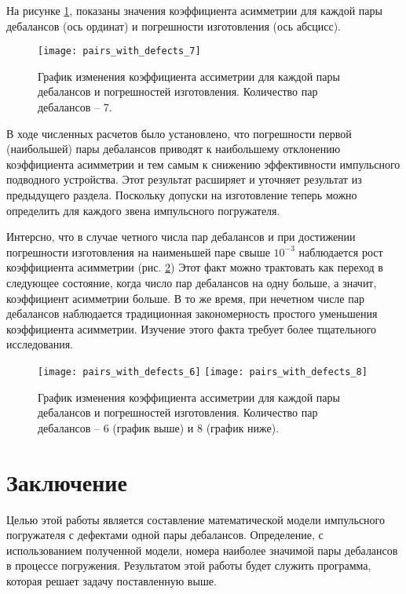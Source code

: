 На рисунке \ref{fig:pairs_with_defects_7}, показаны значения коэффициента асимметрии для каждой
пары дебалансов (ось ординат) и погрешности изготовления (ось абсцисс).

\begin{figure}[ht]
    \centering
    \texttt{[image: pairs\_with\_defects\_7]}
    \caption{График изменения коэффициента ассиметрии для каждой пары дебалансов и погрешностей изготовления.
    Количество пар дебалансов -- 7.}
    \label{fig:pairs_with_defects_7}
\end{figure}

В ходе численных расчетов было установлено, что погрешности первой (наибольшей) пары дебалансов приводят к наибольшему отклонению коэффициента
асимметрии и тем самым к снижению эффективности импульсного подводного устройства. Этот результат расширяет и уточняет результат из предыдущего раздела.
Поскольку допуски на изготовление теперь можно определить для каждого звена импульсного погружателя.

Интерсно, что в случае четного числа пар дебалансов и при достижении погрешности изготовления на наименьшей паре свыше $10^{-3}$ наблюдается рост
коэффициента асимметрии (рис. \ref{fig:pairs_with_defects_even}) Этот факт можно трактовать как переход в следующее состояние,
когда число пар дебалансов на одну больше, а значит, коэффициент асимметрии больше. В то же время, при нечетном числе пар дебалансов
наблюдается традиционная закономерность простого уменьшения коэффициента асимметрии.
Изучение этого факта требует более тщательного исследования.

\begin{figure}[ht]
    \centering
    \texttt{[image: pairs\_with\_defects\_6]}
    \texttt{[image: pairs\_with\_defects\_8]}
    \caption{График изменения коэффициента ассиметрии для каждой пары дебалансов и погрешностей изготовления.
    Количество пар дебалансов -- 6 (график выше) и 8 (график ниже).}
    \label{fig:pairs_with_defects_even}
\end{figure}

\clearpage

\section*{Заключение}

Целью этой работы является составление математической модели импульсного погружателя с дефектами одной пары дебалансов.
Определение, с использованием полученной модели, номера наиболее значимой пары дебалансов в процессе погружения.
Результатом этой работы будет служить программа, которая решает задачу поставленную выше.

